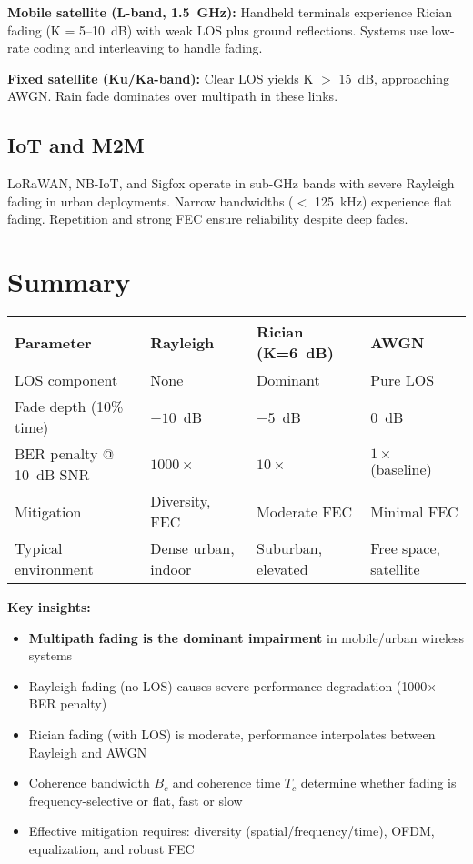 \textbf{Mobile satellite (L-band, 1.5~GHz):} Handheld terminals experience Rician fading (K = 5--10~dB) with weak LOS plus ground reflections. Systems use low-rate coding and interleaving to handle fading.

\textbf{Fixed satellite (Ku/Ka-band):} Clear LOS yields K $>$ 15~dB, approaching AWGN. Rain fade dominates over multipath in these links.

\subsection{IoT and M2M}

LoRaWAN, NB-IoT, and Sigfox operate in sub-GHz bands with severe Rayleigh fading in urban deployments. Narrow bandwidths ($<$ 125~kHz) experience flat fading. Repetition and strong FEC ensure reliability despite deep fades.

\section{Summary}

\begin{center}
\begin{tabular}{llll}
\toprule
\textbf{Parameter} & \textbf{Rayleigh} & \textbf{Rician (K=6~dB)} & \textbf{AWGN} \\
\midrule
LOS component & None & Dominant & Pure LOS \\
Fade depth (10\% time) & $-10$~dB & $-5$~dB & 0~dB \\
BER penalty @ 10~dB SNR & $1000\times$ & $10\times$ & $1\times$ (baseline) \\
Mitigation & Diversity, FEC & Moderate FEC & Minimal FEC \\
Typical environment & Dense urban, indoor & Suburban, elevated & Free space, satellite \\
\bottomrule
\end{tabular}
\end{center}

\textbf{Key insights:}
\begin{itemize}
\item \textbf{Multipath fading is the dominant impairment} in mobile/urban wireless systems
\item Rayleigh fading (no LOS) causes severe performance degradation (1000× BER penalty)
\item Rician fading (with LOS) is moderate, performance interpolates between Rayleigh and AWGN
\item Coherence bandwidth $B_c$ and coherence time $T_c$ determine whether fading is frequency-selective or flat, fast or slow
\item Effective mitigation requires: diversity (spatial/frequency/time), OFDM, equalization, and robust FEC
\end{itemize}

